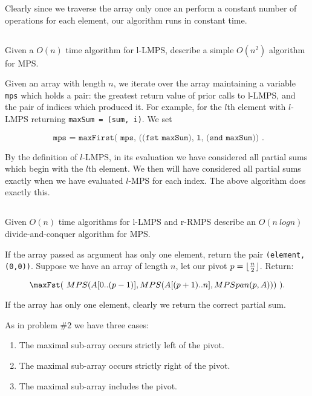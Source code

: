 \documentclass{amsart}
\theoremstyle{definition}
\theoremstyle{remark}
\numberwithin{equation}{section}
\DeclarePairedDelimiter{\floor}{\lfloor}{\rfloor}
\begin{document}
\rmk Clearly since we traverse the array only once an perform a constant number of operations
for each element, our algorithm runs in constant time.

\subsection{} Given a $O(n)$ time algorithm for l-LMPS, describe a simple $O(n^2)$ algorithm for MPS.


Given an array with length $n$, we iterate over the array maintaining a
variable \texttt{mps} which holds a pair: the greatest return value of prior calls to l-LMPS,
and the pair of indices which produced it. For example, for the $l$th element with $l$-LMPS
returning \texttt{maxSum = (sum, i)}. We set

$$\texttt{ mps = maxFirst( mps, ((fst maxSum), l, (snd maxSum)) }. $$

\proof

By the definition of $l$-LMPS, in its evaluation we have considered
all partial sums which begin with the $l$th element. We then will have
considered all partial sums exactly when we have evaluated $l$-MPS for
each index. The above algorithm does exactly this.


\subsection{} Given $O(n)$ time algorithms for l-LMPS and r-RMPS
describe an $O(n\ log n)$ divide-and-conquer algorithm for MPS.


If the array passed as argument has only one element, return the pair \texttt{(element, (0,0))}.
Suppose we have an array of length $n$, let our pivot $p = \floor{ \frac{n}{2} }$.
Return:

$$ \maxFst (\ MPS( A[0..(p-1)], MPS( A[(p+1)..n], MPSpan(p, A) ) )\ ). $$

\proof

If the array has only one element, clearly we return the correct partial sum.

As in problem \#2 we have three cases:

\begin{enumerate}
  \item The maximal sub-array occurs strictly left of the pivot.
  \item The maximal sub-array occurs strictly right of the pivot.
  \item The maximal sub-array includes the pivot.
\end{enumerate}
\end{document}
